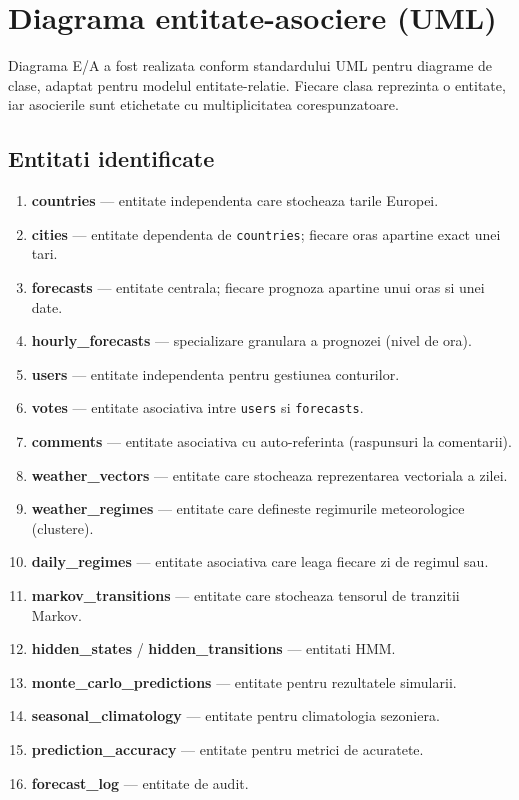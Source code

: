 \documentclass[12pt,a4paper]{article}
\begin{document}
\vspace{0.8cm}

\section{Diagrama entitate-asociere (UML)}

Diagrama E/A a fost realizata conform standardului UML pentru diagrame de clase, adaptat pentru modelul entitate-relatie. Fiecare clasa reprezinta o entitate, iar asocierile sunt etichetate cu multiplicitatea corespunzatoare.

\subsection{Entitati identificate}

\begin{enumerate}
    \item \textbf{countries} --- entitate independenta care stocheaza tarile Europei.
    \item \textbf{cities} --- entitate dependenta de \texttt{countries}; fiecare oras apartine exact unei tari.
    \item \textbf{forecasts} --- entitate centrala; fiecare prognoza apartine unui oras si unei date.
    \item \textbf{hourly\_forecasts} --- specializare granulara a prognozei (nivel de ora).
    \item \textbf{users} --- entitate independenta pentru gestiunea conturilor.
    \item \textbf{votes} --- entitate asociativa intre \texttt{users} si \texttt{forecasts}.
    \item \textbf{comments} --- entitate asociativa cu auto-referinta (raspunsuri la comentarii).
    \item \textbf{weather\_vectors} --- entitate care stocheaza reprezentarea vectoriala a zilei.
    \item \textbf{weather\_regimes} --- entitate care defineste regimurile meteorologice (clustere).
    \item \textbf{daily\_regimes} --- entitate asociativa care leaga fiecare zi de regimul sau.
    \item \textbf{markov\_transitions} --- entitate care stocheaza tensorul de tranzitii Markov.
    \item \textbf{hidden\_states} / \textbf{hidden\_transitions} --- entitati HMM.
    \item \textbf{monte\_carlo\_predictions} --- entitate pentru rezultatele simularii.
    \item \textbf{seasonal\_climatology} --- entitate pentru climatologia sezoniera.
    \item \textbf{prediction\_accuracy} --- entitate pentru metrici de acuratete.
    \item \textbf{forecast\_log} --- entitate de audit.
\end{enumerate}
\end{document}
